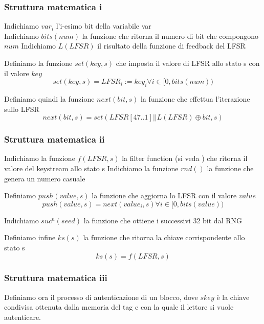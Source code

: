 \begin{frame}
    \frametitle{Struttura matematica i}
    Indichiamo \(var_i\) l'i-esimo bit della variabile var \\
    Indichiamo \(bits(num)\) la funzione che ritorna il numero di bit che compongono \(num\)
    Indichiamo \(L(LFSR)\) il risultato della funzione di feedback del LFSR~\cite{garcia2008dismantling}

    \pause
    Definiamo la funzione \(set(key, s)\) che imposta il valore di LFSR allo stato s con il valore \(key\)
    \[set(key, s) = LFSR_i := key_i \forall i \in [0, bits(num))\]

    \pause
    Definiamo quindi la funzione \(next(bit, s)\) la funzione che effettua l'iterazione sullo LFSR
    \[next(bit, s) = set(LFSR[47..1] || L(LFSR) \oplus bit, s)\]
\end{frame}

\begin{frame}
    \frametitle{Struttura matematica ii}
    Indichiamo la funzione \(f(LFSR, s)\) la filter function (si veda \cite{garcia2008dismantling}) che ritorna il valore del keystream allo stato s
    Indichiamo la funzione \(rnd()\) la funzione che genera un numero casuale

    \pause
    Definiamo \(push(value, s)\) la funzione che aggiorna lo LFSR con il valore \(value\)
    \[push(value, s) = next(value_i, s) \forall i \in [0, bits(value))\]

    \pause
    Indichiamo \(suc^n(seed)\) la funzione che ottiene i successivi 32 bit dal RNG~\cite{secRFIDMutualAuth}

    \pause
    Definiamo infine \(ks(s)\) la funzione che ritorna la chiave corrispondente allo stato s
    \[ks(s) = f(LFSR, s)\]
\end{frame}

\begin{frame}
    \frametitle{Struttura matematica iii}
    Definiamo ora il processo di autenticazione di un blocco, dove \(skey\) è la chiave condivisa ottenuta dalla memoria del tag e con la quale il lettore si vuole autenticare.
\end{frame}

